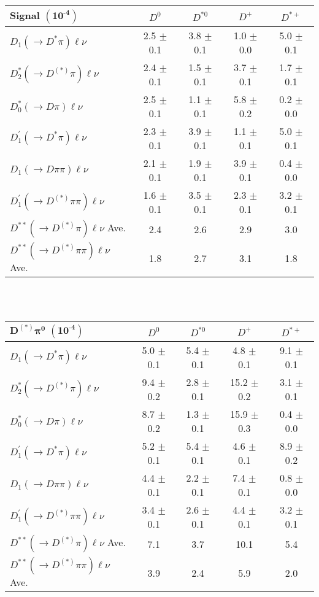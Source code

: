 \documentclass[12pt]{article}
\begin{document}
 

\begin{tabular}{|l||c|c|c|c|}
\hline
\bf{Signal }$\boldsymbol{(10^{\mbox{-}4})}$ & $D^0$ & $D^{*0}$ & $D^+$ & $D^{*+}$ \\
\hline \hline
$D_1(\to D^*\pi)\ell\nu$ & 2.5 $\pm$ 0.1 & 3.8 $\pm$ 0.1 & 1.0 $\pm$ 0.0 & 5.0 $\pm$ 0.1 \\
$D_2^*(\to D^{(*)}\pi)\ell\nu$ & 2.4 $\pm$ 0.1 & 1.5 $\pm$ 0.1 & 3.7 $\pm$ 0.1 & 1.7 $\pm$ 0.1 \\
$D_0^*(\to D\pi)\ell\nu$ & 2.5 $\pm$ 0.1 & 1.1 $\pm$ 0.1 & 5.8 $\pm$ 0.2 & 0.2 $\pm$ 0.0 \\
$D_1^{'}(\to D^*\pi)\ell\nu$ & 2.3 $\pm$ 0.1 & 3.9 $\pm$ 0.1 & 1.1 $\pm$ 0.1 & 5.0 $\pm$ 0.1 \\
\hline
$D_1(\to D\pi\pi)\ell\nu$ & 2.1 $\pm$ 0.1 & 1.9 $\pm$ 0.1 & 3.9 $\pm$ 0.1 & 0.4 $\pm$ 0.0 \\
$D_1^{'}(\to D^{(*)}\pi\pi)\ell\nu$ & 1.6 $\pm$ 0.1 & 3.5 $\pm$ 0.1 & 2.3 $\pm$ 0.1 & 3.2 $\pm$ 0.1 \\
\hline\hline
$D^{**}(\to D^{(*)}\pi)\ell\nu$ Ave. & 2.4 & 2.6 & 2.9 & 3.0 \\
$D^{**}(\to D^{(*)}\pi\pi)\ell\nu$ Ave. & 1.8 & 2.7 & 3.1 & 1.8 \\
\hline\hline \end{tabular}
\\ \\

\begin{tabular}{|l||c|c|c|c|}
\hline
$\boldsymbol{D^{(*)}\pi^0\,\,(10^{\mbox{-}4})}$ & $D^0$ & $D^{*0}$ & $D^+$ & $D^{*+}$ \\
\hline \hline
$D_1(\to D^*\pi)\ell\nu$ & 5.0 $\pm$ 0.1 & 5.4 $\pm$ 0.1 & 4.8 $\pm$ 0.1 & 9.1 $\pm$ 0.1 \\
$D_2^*(\to D^{(*)}\pi)\ell\nu$ & 9.4 $\pm$ 0.2 & 2.8 $\pm$ 0.1 & 15.2 $\pm$ 0.2 & 3.1 $\pm$ 0.1 \\
$D_0^*(\to D\pi)\ell\nu$ & 8.7 $\pm$ 0.2 & 1.3 $\pm$ 0.1 & 15.9 $\pm$ 0.3 & 0.4 $\pm$ 0.0 \\
$D_1^{'}(\to D^*\pi)\ell\nu$ & 5.2 $\pm$ 0.1 & 5.4 $\pm$ 0.1 & 4.6 $\pm$ 0.1 & 8.9 $\pm$ 0.2 \\
\hline
$D_1(\to D\pi\pi)\ell\nu$ & 4.4 $\pm$ 0.1 & 2.2 $\pm$ 0.1 & 7.4 $\pm$ 0.1 & 0.8 $\pm$ 0.0 \\
$D_1^{'}(\to D^{(*)}\pi\pi)\ell\nu$ & 3.4 $\pm$ 0.1 & 2.6 $\pm$ 0.1 & 4.4 $\pm$ 0.1 & 3.2 $\pm$ 0.1 \\
\hline\hline
$D^{**}(\to D^{(*)}\pi)\ell\nu$ Ave. & 7.1 & 3.7 & 10.1 & 5.4 \\
$D^{**}(\to D^{(*)}\pi\pi)\ell\nu$ Ave. & 3.9 & 2.4 & 5.9 & 2.0 \\
\hline\hline \end{tabular}
\end{document}
